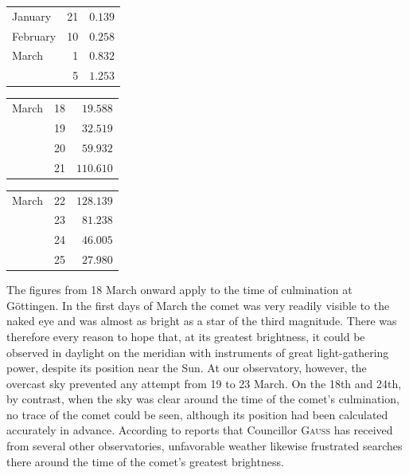\begin{center}
\begin{tabular}{lr|r}
January & 21 & $0.139$ \\
February & 10 & $0.258$ \\
March & 1 & $0.832$ \\
& 5 & $1.253$ \\
\end{tabular}
\end{center}
\begin{center}
\begin{tabular}{lr|r}
March & 18 & $19.588$ \\
& 19 & $32.519$ \\
& 20 & $59.932$ \\
& 21 & $110.610$ \\
\end{tabular}
\end{center}
\begin{center}
\begin{tabular}{lr|r}
March & 22 & $128.139$ \\
& 23 & $81.238$ \\
& 24 & $46.005$ \\
& 25 & $27.980$ \\
\end{tabular}
\end{center}

The figures from 18 March onward apply to the time of culmination at Göttingen. In the first days of March the comet was very readily visible to the naked eye and was almost as bright as a star of the third magnitude. There was therefore every reason to hope that, at its greatest brightness, it could be observed in daylight on the meridian with instruments of great light-gathering power, despite its position near the Sun. At our observatory, however, the overcast sky prevented any attempt from 19 to 23 March. On the 18th and 24th, by contrast, when the sky was clear around the time of the comet’s
%
culmination, no trace of the comet could be seen, although its position had been calculated accurately in advance. According to reports that Councillor \textsc{Gauss} has received from several other observatories, unfavorable weather likewise frustrated searches there around the time of the comet’s greatest brightness.
